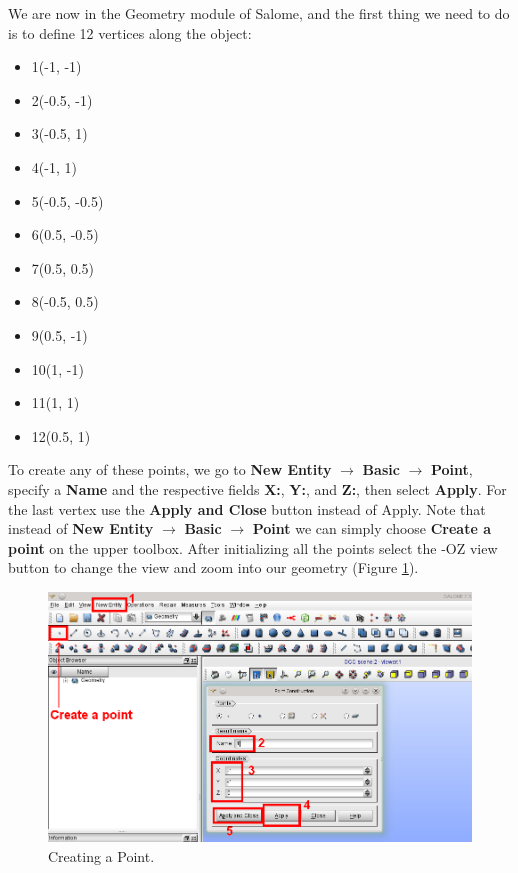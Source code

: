 We are now in the Geometry module of Salome, and the first thing we need to do is to define 12 vertices along the object: 
\begin{itemize}
 \item 1(-1, -1)
 \item 2(-0.5, -1)
 \item 3(-0.5, 1)
 \item 4(-1, 1)
 \item 5(-0.5, -0.5)
 \item 6(0.5, -0.5)
 \item 7(0.5, 0.5)
 \item 8(-0.5, 0.5)
 \item 9(0.5, -1)
 \item 10(1, -1)
 \item 11(1, 1)
 \item 12(0.5, 1)
\end{itemize}
To create any of these points, we go to \textbf{New Entity} $\rightarrow$ \textbf{Basic} $\rightarrow$ \textbf{Point}, specify a \textbf{Name} and the respective fields \textbf{X:}, \textbf{Y:}, and \textbf{Z:}, then select \textbf{Apply}. For the last vertex use the \textbf{Apply and Close} button instead of Apply. Note that instead of \textbf{New Entity} $\rightarrow$ \textbf{Basic} $\rightarrow$ \textbf{Point} we can simply choose \textbf{Create a point} on the upper toolbox. After initializing all the points select the -OZ view button to change the view and zoom into our geometry (Figure \ref{fig:no3.2.1.5}).

\begin{figure}[tbp]
\begin{center}
\includegraphics[scale=0.50]{figures/SalomeStep1b.png}
\caption{Creating a Point.}
\label{fig:no3.2.1.5}
\end{center}
\end{figure}

